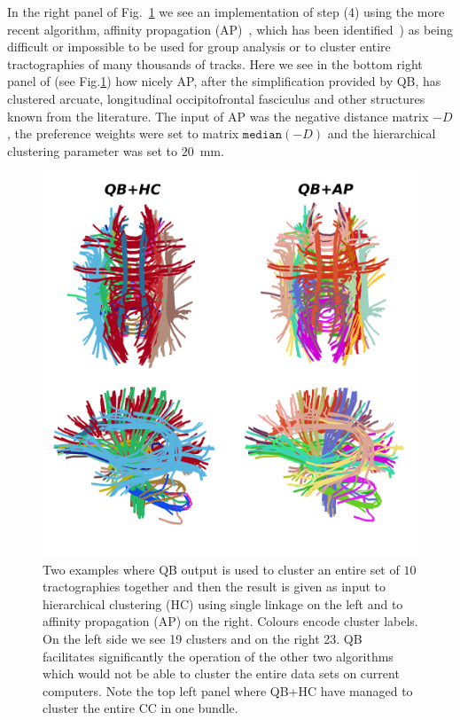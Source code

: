 \documentclass[preprint,authoryear,a4paper,10pt,onecolumn]{elsarticle}
\begin{document}
In the right panel of Fig.~\ref{Flo:LSC+HC+AP} we see an implementation
of step (4) using the more recent algorithm, affinity propagation
(AP)~\citep{dueck2009affinity}, which has been
identified~\citep{malcolm2009filtered}) as being difficult or impossible
to be used for group analysis or to cluster entire tractographies of
many thousands of tracks.
Here we see in the bottom right panel of (see Fig.\ref{Flo:LSC+HC+AP})
how nicely AP, after the simplification provided by QB, has clustered
arcuate, longitudinal occipitofrontal fasciculus and other structures
known from the literature. The input of AP was the negative distance
matrix $-D$, the preference weights were set to matrix $\mathtt{median}(-D)$
and the hierarchical clustering parameter was set to $20$~mm.

\begin{figure}
\begin{centering}
\includegraphics[scale=0.7]{last_figures/LSC_with_others}
\par\end{centering}
\caption{Two examples where QB output is used to cluster an entire set
  of $10$ tractographies together and then the result is given as input
  to hierarchical clustering (HC) using single linkage on the left and
  to affinity propagation (AP) on the right. Colours encode cluster
  labels. On the left side we see 19 clusters and on the right 23. QB
  facilitates significantly the operation of the other two algorithms
  which would not be able to cluster the entire data sets on current
  computers. Note the top left panel where QB+HC have managed to cluster
  the entire CC in one bundle.\label{Flo:LSC+HC+AP}}
\end{figure}
\end{document}
